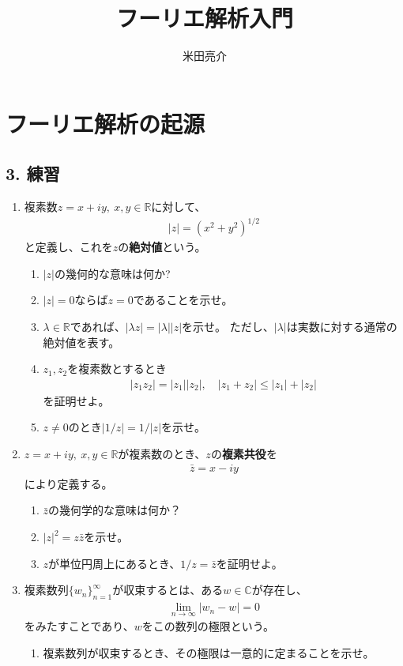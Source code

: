 \documentclass{jreport}
\begin{document}
\title{フーリエ解析入門}
\author{米田亮介}
\maketitle

\chapter{フーリエ解析の起源}
\section*{3. 練習}

\begin{enumerate}[label=\textbf{\arabic*.}]
\item 複素数$z=x+iy,\ x,y\in\mathbb{R}$に対して、
\begin{align}
    |z|=(x^{2}+y^{2})^{1/2}
\end{align}
と定義し、これを$z$の\textbf{絶対値}という。
\begin{enumerate}
\item $|z|$の幾何的な意味は何か?
\item $|z|=0$ならば$z=0$であることを示せ。
\item $\lambda\in\mathbb{R}$であれば、$|\lambda z|=|\lambda||z|$を示せ。
ただし、$|\lambda|$は実数に対する通常の絶対値を表す。
\item $z_{1},z_{2}$を複素数とするとき
\begin{align}
    |z_{1}z_{2}|=|z_{1}||z_{2}|,\quad |z_{1}+z_{2}|\leq|z_{1}|+|z_{2}|
\end{align}
を証明せよ。
\item $z\ne0$のとき$|1/z|=1/|z|$を示せ。
\end{enumerate}
\item $z=x+iy,\ x,y\in\mathbb{R}$が複素数のとき、$z$の\textbf{複素共役}を
\begin{align}
\bar{z}=x-iy
\end{align}
により定義する。
\begin{enumerate}
\item $\bar{z}$の幾何学的な意味は何か？
\item $|z|^{2}=z\bar{z}$を示せ。
\item $z$が単位円周上にあるとき、$1/z=\bar{z}$を証明せよ。
\end{enumerate}
\item 複素数列$\{w_{n}\}_{n=1}^{\infty}$が収束するとは、ある$w\in\mathbb{C}$が存在し、
\begin{align}
    \lim_{n\to\infty}|w_{n}-w|=0
\end{align}
をみたすことであり、$w$をこの数列の極限という。
\begin{enumerate}
\item 複素数列が収束するとき、その極限は一意的に定まることを示せ。


\end{enumerate}
\end{enumerate}
\end{document}
